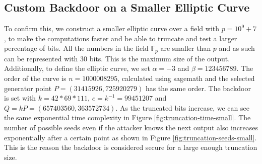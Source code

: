 \subsection{Custom Backdoor on a Smaller Elliptic Curve}

To confirm this, we construct a smaller elliptic curve over a field with $p = 10^9 + 7$, to make the computations faster and be able to truncate and test a larger percentage of bits. All the numbers in the field $\mathbb{F}_p$ are smaller than $p$ and as such can be represented with $30$ bits. This is the maximum size of the output.
\\

Additionally, to define the elliptic curve, we set $\alpha = -3$ and $\beta = 123456789$. The order of the curve is $n = 1000008295$, calculated using sagemath \cite{sagemath} and the selected generator point $P = (31415926, 725920279)$ has the same order. The backdoor is set with $k = 42 * 69 * 111$, $e = k^{-1} = 99451207$ and $Q = kP = (657403560, 363572734)$. As the truncated bits increase, we can see the same exponential time complexity in Figure \ref{fig:truncation-time-small}. The number of possible seeds even if the attacker knows the next output also increases exponentially after a certain point as shown in Figure \ref{fig:truncation-seeds-small}. This is the reason the backdoor is considered secure for a large enough truncation size.

